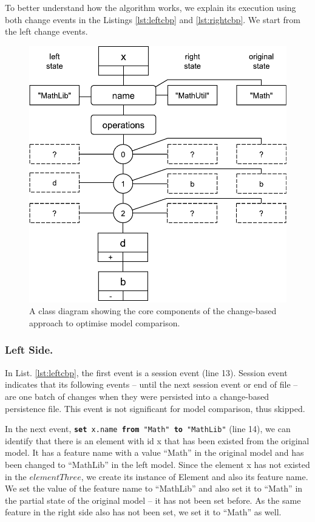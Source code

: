 \documentclass{llncs}
\begin{document}
To better understand how the algorithm works, we explain its execution using both change events in the Listings \ref{lst:leftcbp} and \ref{lst:rightcbp}. We start from the left change events. 

\begin{figure}
    \vspace{-20pt}
    \includegraphics[width=\linewidth]{images/LeftElementTreeDiagram}
    \caption{A class diagram showing the core components of the change-based approach to optimise model comparison.}
    \label{fig:left_element_tree_diagram}
\end{figure}

\vspace{-10pt}
\subsubsection{Left Side.}\label{sec:left_side} In List. \ref{lst:leftcbp}, the first event is a \textsf{session} event (line 13). \textsf{Session} event indicates that its following events -- until the next session event or end of file -- are one batch of changes when they were persisted into a change-based persistence file. This event is not significant for model comparison, thus skipped. 

In the next event, \texttt{\small \textbf{set} x.name \textbf{from} "Math" \textbf{to} "MathLib"} (line 14), we can identify that there is an element with id \textsf{x} that has been existed from the original model. It has a feature \textsf{name} with a value ``Math'' in the original model and has been changed to ``MathLib'' in the left model. Since the element \textsf{x} has not existed in the $elementThree$, we create its instance of \textsf{Element} and also its feature \textsf{name}. We set the value of the feature \textsf{name} to ``MathLib'' and also set it to ``Math'' in the partial state of the original model -- it has not been set before. As the same feature in the right side also has not been set, we set it to ``Math'' as well.          
\end{document}
